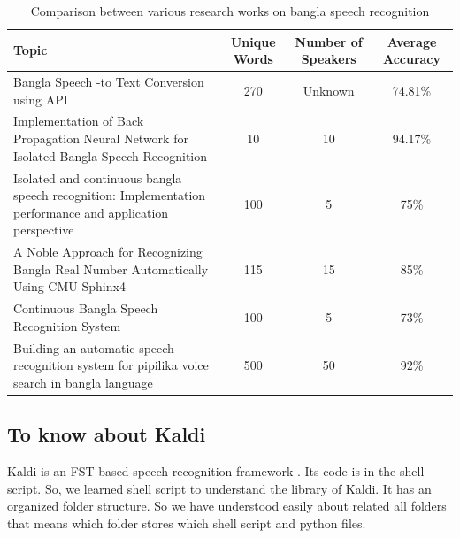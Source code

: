 \documentclass{standalone}
\begin{document}
\begin{table}[ht]
\centering
\begin{tabular}{|C{6cm} | c | c | c|}
\hline 
Topic & Unique Words & Number of Speakers & Average Accuracy \\ [0.8ex] %
\hline %
Bangla Speech -to Text
Conversion using API & 270 & Unknown & 74.81\% \\ 
\hline Implementation of Back Propagation
Neural Network for Isolated
Bangla Speech Recognition & 10 & 10 & 94.17\% \\ 
\hline Isolated and continuous bangla
speech recognition: Implementation
performance and application perspective & 100 & 5 & 75\% \\
\hline A Noble Approach for Recognizing
Bangla Real Number Automatically
Using CMU Sphinx4 & 115 & 15 & 85\% \\
\hline Continuous Bangla Speech
Recognition System & 100 & 5 & 73\% \\
\hline Building an automatic speech recognition system for pipilika voice search in bangla language & 500 & 50 & 92\% \\ [1ex] %
\hline %

\end{tabular}
\caption{Comparison between various research works on bangla speech recognition} %
\label{table: comp_researches} %
\end{table}

\subsection{To know about Kaldi}
Kaldi is an FST based speech recognition framework \cite{povey2011kaldi}. Its code is in the shell script. So, we learned shell script to understand the library of Kaldi. It has an organized folder structure. So we have understood easily about related all folders that means which folder stores which shell script and python files. 
\end{document}
